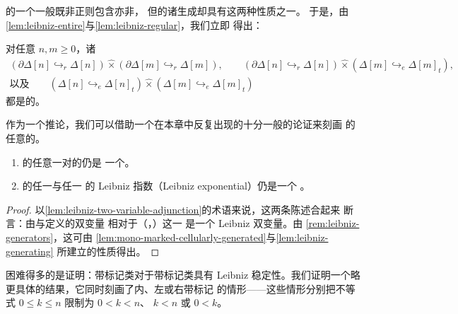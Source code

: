 \trMarkedSimplicialSet{}的一个一般\trMonomorphism{}既非正则包含亦非\trEntireInclusion，
但\trMarkedSimplicialSet{}的诸生成\trMonomorphism{}却具有这两种性质之一。
于是，由\cref{lem:leibniz-entire}与\cref{lem:leibniz-regular}，我们立即
得出：

\begin{lemma}\label{lem:leibniz-generating}
对任意 $n,m\ge 0$，诸\trLeibnizProduct
\begin{gather*}
(\partial\Delta[n]\hookrightarrow_{r}\Delta[n])\mathbin{\widehat{\times}}
(\partial\Delta[m]\hookrightarrow_{r}\Delta[m]),\qquad
(\partial\Delta[n]\hookrightarrow_{r}\Delta[n])\mathbin{\widehat{\times}}
(\Delta[m]\hookrightarrow_{e}\Delta[m]_{t}),\\
\text{以及}\qquad
(\Delta[n]\hookrightarrow_{e}\Delta[n]_{t})\mathbin{\widehat{\times}}
(\Delta[m]\hookrightarrow_{e}\Delta[m]_{t})
\end{gather*}
都是\trMarkedSimplicialSet{}的\trMonomorphism。
\end{lemma}

作为一个推论，我们可以借助一个在本章中反复出现的十分一般的论证来刻画%
\trMarkedSimplicialSet{}的任意\trMonomorphism{}的\trLeibnizProduct。

\begin{corollary}\label{cor:leibniz-mono-tf}
\begin{enumerate}[label=(\roman*)]
\item \trMarkedSimplicialSet{}的任意一对\trMonomorphism{}的\trLeibnizProduct{}仍是
  一个\trMonomorphism。
\item \trMarkedSimplicialSet{}的任一\trTrivialFibration{}与任一%
  \trMonomorphism{}的 Leibniz 指数（Leibniz exponential）仍是一个%
  \trTrivialFibration。
\end{enumerate}
\end{corollary}

\begin{proof}
以\cref{lem:leibniz-two-variable-adjunction}的术语来说，这两条陈述合起来
断言：由\trCartesianProduct{}与\trInternalHom{}定义的双变量\trAdjunction{}%
相对于（\trMonomorphism，\trTrivialFibration）这一%
\trWeakFactorizationSystem{}是一个 Leibniz 双变量\trAdjunction。由
\cref{rem:leibniz-generators}，这可由
\cref{lem:mono-marked-cellularly-generated}与\cref{lem:leibniz-generating}
所建立的性质得出。
\end{proof}

困难得多的是证明：带标记\trAnodyneExtension{}类对于带标记\trMonomorphism{}类具有
Leibniz 稳定性。我们证明一个略更具体的结果，它同时刻画了内、左或右带标记%
\trAnodyneExtension{}的情形——这些情形分别把不等式 $0\le k\le n$ 限制为 $0<k<n$、
$k<n$ 或 $0<k$。

